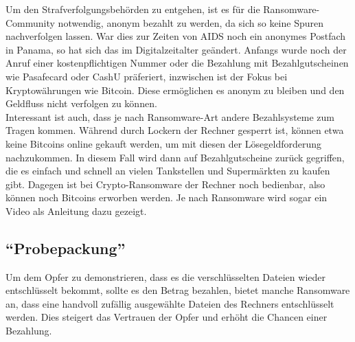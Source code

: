 Um den Strafverfolgungsbehörden zu entgehen, ist es für die Ransomware-Community notwendig, anonym bezahlt zu werden, da sich so keine Spuren nachverfolgen lassen. War dies zur Zeiten von AIDS noch ein anonymes Postfach in Panama, so hat sich das im Digitalzeitalter geändert. Anfangs wurde noch der Anruf einer kostenpflichtigen Nummer oder die Bezahlung mit Bezahlgutscheinen wie Pasafecard oder CashU präferiert, inzwischen ist der Fokus bei Kryptowährungen wie Bitcoin. Diese ermöglichen es anonym zu bleiben und den Geldfluss nicht verfolgen zu können.\\

Interessant ist auch, dass je nach Ransomware-Art andere Bezahlsysteme zum Tragen kommen. Während durch Lockern der Rechner gesperrt ist, können etwa keine Bitcoins online gekauft werden, um mit diesen der Lösegeldforderung nachzukommen. In diesem Fall wird dann auf Bezahlgutscheine zurück gegriffen, die es einfach und schnell an vielen Tankstellen und Supermärkten zu kaufen gibt. Dagegen ist bei Crypto-Ransomware der Rechner noch bedienbar, also können noch Bitcoins erworben werden. Je nach Ransomware wird sogar ein Video als Anleitung dazu gezeigt.

\subsection{``Probepackung''}

Um dem Opfer zu demonstrieren, dass es die verschlüsselten Dateien wieder entschlüsselt bekommt, sollte es den Betrag bezahlen, bietet manche Ransomware an, dass eine handvoll zufällig ausgewählte Dateien des Rechners entschlüsselt werden. Dies steigert das Vertrauen der Opfer und erhöht die Chancen einer Bezahlung.